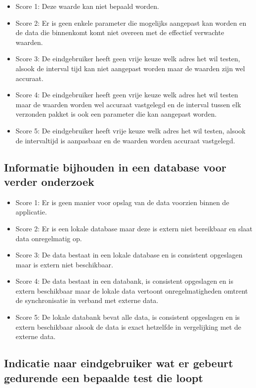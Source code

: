 \begin{itemize}
    \item Score 1: Deze waarde kan niet bepaald worden.
    \item Score 2: Er is geen enkele parameter die mogelijks aangepast kan worden en de data die binnenkomt komt niet overeen met de effectief verwachte waarden.
    \item Score 3: De eindgebruiker heeft geen vrije keuze welk adres het wil testen, alsook de interval tijd kan niet aangepast worden maar de waarden zijn wel accuraat.
    \item Score 4: De eindgebruiker heeft geen vrije keuze welk adres het wil testen maar de waarden worden wel accuraat vastgelegd en de interval tussen elk verzonden pakket is ook een parameter die kan aangepast worden.
    \item Score 5: De eindgebruiker heeft vrije keuze welk adres het wil testen, alsook de intervaltijd is aanpasbaar en de waarden worden accuraat vastgelegd.
\end{itemize}

\subsection{Informatie bijhouden in een database voor verder onderzoek}

\begin{itemize}
    \item Score 1: Er is geen manier voor opslag van de data voorzien binnen de applicatie.
    \item Score 2: Er is een lokale database maar deze is extern niet bereikbaar en slaat data onregelmatig op.
    \item Score 3: De data bestaat in een lokale database en is consistent opgeslagen maar is extern niet beschikbaar.
    \item Score 4: De data bestaat in een databank, is consistent opgeslagen en is extern beschikbaar maar de lokale data vertoont onregelmatigheden omtrent de synchronisatie in verband met externe data.
    \item Score 5: De lokale databank bevat alle data, is consistent opgeslagen en is extern beschikbaar alsook de data is exact hetzelfde in vergelijking met de externe data. 
\end{itemize}

\subsection{Indicatie naar eindgebruiker wat er gebeurt gedurende een bepaalde test die loopt}

